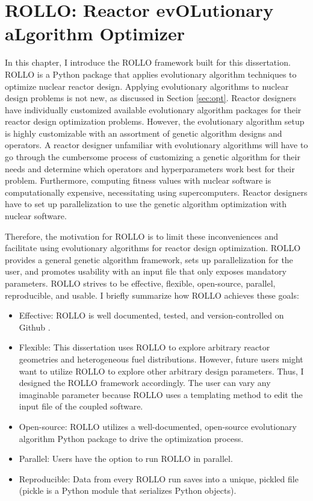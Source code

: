\chapter{ROLLO: Reactor evOLutionary aLgorithm Optimizer}
\label{chap:rollo}
In this chapter, I introduce the \gls{ROLLO} framework built 
for this dissertation. 
\gls{ROLLO} is a Python package that applies evolutionary algorithm 
techniques to optimize nuclear reactor design. 
Applying evolutionary algorithms to nuclear design problems is not new, as
discussed in Section \ref{sec:opt}. 
Reactor designers have individually customized available evolutionary algorithm 
packages for their reactor design optimization problems.
However, the evolutionary algorithm setup is highly customizable with
an assortment of genetic algorithm designs and operators.
A reactor designer unfamiliar with evolutionary algorithms will have
to go through the cumbersome process of customizing a genetic algorithm 
for their needs and determine which operators and hyperparameters work best for 
their problem. 
Furthermore, computing fitness values with nuclear software is computationally 
expensive, necessitating using supercomputers. 
Reactor designers have to set up parallelization to use the genetic algorithm 
optimization with nuclear software.

Therefore, the motivation for \gls{ROLLO} is to limit these inconveniences and 
facilitate using evolutionary algorithms for reactor design optimization.
\gls{ROLLO} provides a general genetic algorithm framework, sets up 
parallelization for the user, and promotes usability with an input file 
that only exposes mandatory parameters.
\gls{ROLLO} strives to be effective, flexible, open-source, parallel, reproducible, 
and usable. 
I briefly summarize how \gls{ROLLO} achieves these goals:  
\begin{itemize}
    \item Effective: \gls{ROLLO} is well documented, tested, and 
    version-controlled on Github \cite{chee_rollo_2021}.
    \item Flexible: This dissertation uses \gls{ROLLO} to 
    explore arbitrary reactor geometries and heterogeneous fuel distributions. 
    However, future users might want to utilize \gls{ROLLO} 
    to explore other arbitrary design parameters. Thus, I designed the \gls{ROLLO}
    framework accordingly. The user can vary any imaginable parameter 
    because \gls{ROLLO} uses a templating method to edit the input file of the 
    coupled software.
    \item Open-source: \gls{ROLLO} utilizes a well-documented, open-source 
    evolutionary algorithm Python package to drive the optimization process.
    \item Parallel: Users have the option to run \gls{ROLLO} in parallel.
    \item Reproducible: Data from every \gls{ROLLO} run saves into a unique, pickled 
    file (pickle is a Python module that serializes Python objects).
\end{itemize}

